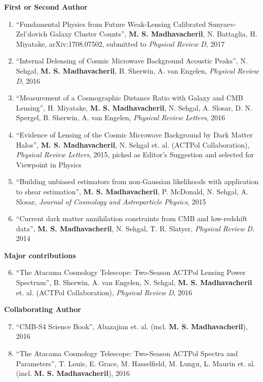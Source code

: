 \documentclass[10pt,margin]{res}
\begin{document}
\begin{resume}
\textbf{First or Second Author}
\\
\begin{enumerate}
\item ``Fundamental Physics from Future Weak-Lensing Calibrated Sunyaev-Zel'dovich Galaxy Cluster Counts'', {\bf M. S. Madhavacheril}, N. Battaglia, H. Miyatake, arXiv:1708.07502, submitted to {\sl Physical Review D}, 2017
\item ``Internal Delensing of Cosmic Microwave Background Acoustic Peaks'', N. Sehgal, {\bf M. S. Madhavacheril}, B. Sherwin, A. van Engelen, {\sl Physical Review D}, 2016
\item ``Measurement of a Cosmographic Distance Ratio with Galaxy and CMB Lensing'', H. Miyatake, {\bf M. S. Madhavacheril}, N. Sehgal, A. Slosar, D. N. Spergel, B. Sherwin, A. van Engelen, {\sl Physical Review Letters}, 2016
\item ``Evidence of Lensing of the Cosmic Microwave Background by Dark Matter Halos'', {\bf M. S. Madhavacheril}, N. Sehgal et. al. (ACTPol Collaboration), {\sl Physical Review Letters}, 2015, picked as Editor's Suggestion and selected for Viewpoint in Physics
\item ``Building unbiased estimators from non-Gaussian likelihoods with application to shear estimation'', {\bf M. S. Madhavacheril}, P. McDonald, N. Sehgal, A. Slosar, {\sl Journal of Cosmology and Astroparticle Physics}, 2015
\item ``Current dark matter annihilation constraints from CMB and low-redshift data'', {\bf M. S. Madhavacheril}, N. Sehgal, T. R. Slatyer, {\sl Physical Review D}, 2014
\end{enumerate}
\textbf{Major contributions}
\\
\begin{enumerate}
\setcounter{enumi}{5}
\item ``The Atacama Cosmology Telescope: Two-Season ACTPol Lensing Power Spectrum'', B. Sherwin, A. van Engelen, N. Sehgal, {\bf M. S. Madhavacheril} et. al. (ACTPol Collaboration), {\sl Physical Review D}, 2016
\end{enumerate}
\textbf{Collaborating Author}
\\
\begin{enumerate}
\setcounter{enumi}{6}
\item ``CMB-S4 Science Book'', Abazajian et. al. (incl. {\bf M. S. Madhavacheril}), 2016
\item ``The Atacama Cosmology Telescope: Two-Season ACTPol Spectra and Parameters'', T. Louis, E. Grace, M. Hasselfield, M. Lungu, L.  Maurin et. al. (incl. {\bf M. S. Madhavacheril}), 2016

\end{enumerate}
\end{resume}
\end{document}
